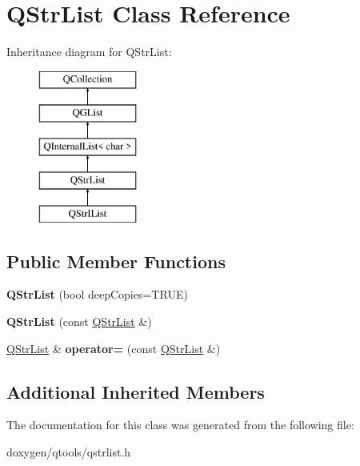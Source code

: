 \hypertarget{class_q_str_list}{}\section{Q\+Str\+List Class Reference}
\label{class_q_str_list}
Inheritance diagram for Q\+Str\+List\+:\begin{figure}[H]
\begin{center}
\leavevmode
\includegraphics[height=5.000000cm]{class_q_str_list}
\end{center}
\end{figure}
\subsection*{Public Member Functions}
\begin{DoxyCompactItemize}
\item 
\mbox{\label{class_q_str_list_aad024fc3e8fcdbb556862b08aceb6f10}} 
{\bfseries Q\+Str\+List} (bool deep\+Copies=T\+R\+UE)
\item 
\mbox{\label{class_q_str_list_ae4faa893d4171b032b4015c1e512172b}} 
{\bfseries Q\+Str\+List} (const \mbox{\hyperlink{class_q_str_list}{Q\+Str\+List}} \&)
\item 
\mbox{\label{class_q_str_list_a8d0c78bb1552ee0d06f45cd00bd86bfc}} 
\mbox{\hyperlink{class_q_str_list}{Q\+Str\+List}} \& {\bfseries operator=} (const \mbox{\hyperlink{class_q_str_list}{Q\+Str\+List}} \&)
\end{DoxyCompactItemize}
\subsection*{Additional Inherited Members}


The documentation for this class was generated from the following file\+:\begin{DoxyCompactItemize}
\item 
doxygen/qtools/qstrlist.\+h\end{DoxyCompactItemize}
